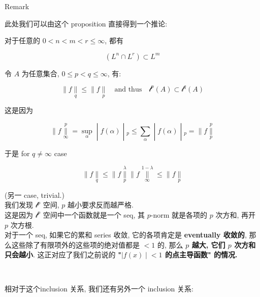 \begin{qlremark}{Remark}

此处我们可以由这个 proposition 直接得到一个推论: ~

\begin{corollary}

对于任意的 \(0 < n < m < r \leq \infty\), 都有

\[(L^{n} \cap L^{r}) \subset L^{m}\]

\end{corollary}

\end{qlremark}

\begin{example}

令 \(A\) 为任意集合, \(0 \leq p < q \leq \infty\), 有:

\[\parallel f\underset{q}{\parallel} \leq \parallel f\underset{p}{\parallel}\quad\text{and thus}\quad\mathcal{l}^{p}(A) \subset \mathcal{l}^{q}(A)\]

这是因为

\[\left. \parallel f\underset{\infty}{\overset{p}{\parallel}} = \sup\limits_{\alpha} \middle| f(\alpha) \middle| {}_{p} \leq \sum\limits_{\alpha} \middle| f(\alpha) \middle| {}_{p} = \parallel f\underset{p}{\overset{p}{\parallel}} \right.\]

于是 for \(q \neq \infty\) case

\[\parallel f\underset{q}{\parallel} \leq \parallel f\underset{p}{\overset{\lambda}{\parallel}} \parallel f\underset{\infty}{\overset{1 - \lambda}{\parallel}} \leq \parallel f\underset{p}{\parallel}\]

(另一 case, trivial.)\\
我们发现 \(\mathcal{l}^{p}\) 空间, \(p\) 越小要求反而越严格.\\
这是因为 \(\mathcal{l}^{p}\) 空间中一个函数就是一个 seq, 其 \(p\)-norm 就是各项的 \(p\) 次方和, 再开 \(p\) 次方根.\\
对于一个 seq, 如果它的累和 series 收敛, 它的各项肯定是 \textbf{eventually 收敛的}, 那么这些除了有限项外的这些项的绝对值都是 \(< 1\) 的, 那么 \textbf{\(p\) 越大, 它们 \(p\) 次方和只会越小}. 这正对应了我们之前说的 \textbf{"\(\left. |f(x) \middle| < 1 \right.\) 的点主导函数" 的情况.}\\
\strut \\

\end{example}

相对于这个inclusion 关系, 我们还有另外一个 inclusion 关系:

